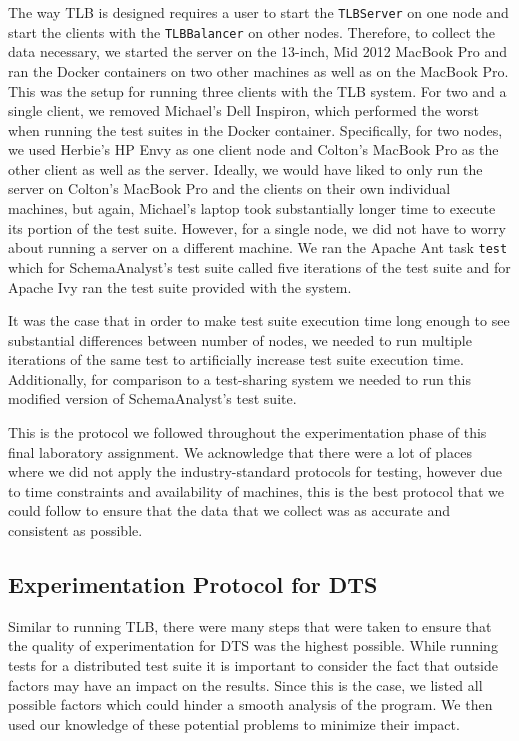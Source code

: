\documentclass{article}
\begin{document}
{The way TLB is designed requires a user to start the \texttt{TLBServer} on one node and start the clients with the \texttt{TLBBalancer}
on other nodes. Therefore, to collect the data necessary, we started the server on the 13-inch, Mid 2012 MacBook Pro
and ran the Docker containers on two other machines as well as on the MacBook Pro. This was the setup for running three
clients with the TLB system. For two and a single client, we removed Michael's Dell Inspiron,  which performed the
worst when running the test suites in the Docker container. Specifically, for two nodes, we used Herbie's HP Envy
as one client node and Colton's MacBook Pro as the other client as well as the server.
Ideally, we would have liked to only run the server on Colton's MacBook Pro and the clients on their own
individual machines, but again, Michael's laptop took substantially longer time to execute its portion of the test suite.
However, for a single node, we did not have to worry about running a server on a different machine. We ran the Apache Ant
task \texttt{test} which for SchemaAnalyst's test suite called five iterations of the test suite and for Apache Ivy
ran the test suite provided with the system.

It was the case that in order to make test suite execution time long enough to see substantial differences between
number of nodes, we needed to run multiple iterations of the same test to artificially increase test suite execution
time. Additionally, for comparison to a test-sharing system we needed to run this modified version of SchemaAnalyst's
test suite.

This is the protocol we followed throughout the experimentation phase of this final laboratory assignment. We acknowledge that
there were a lot of places where we did not apply the industry-standard protocols for testing, however due to time constraints
and availability of machines, this is the best protocol that we could follow to ensure that the data that we collect
was as accurate and consistent as possible.

\subsection{Experimentation Protocol for DTS}
Similar to running TLB, there were many steps that were taken to ensure that the quality of experimentation for DTS was the highest possible. While running tests for a distributed test suite it is important to consider the fact that outside factors may have an impact on the results. Since this is the case, we listed all possible factors which could hinder a smooth analysis of the program. We then used our knowledge of these potential problems to minimize their impact. 
}
\end{document}
